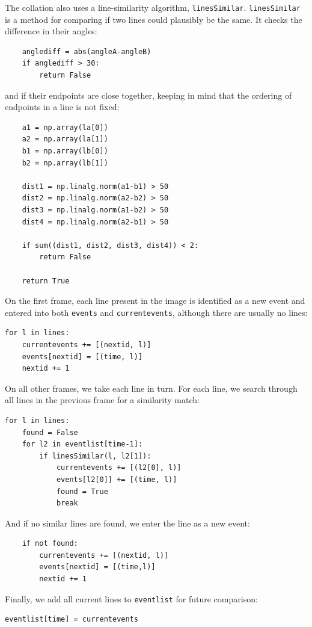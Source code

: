 \documentclass[notitlepage]{article}
\begin{document}
The collation also uses a line-similarity algorithm, \texttt{linesSimilar}.  \texttt{linesSimilar} is a method for comparing if two lines could plausibly be the same.  It checks the difference in their angles:
\begin{lstlisting}
    anglediff = abs(angleA-angleB)
    if anglediff > 30:
        return False
\end{lstlisting}    
and if their endpoints are close together, keeping in mind that the ordering of endpoints in a line is not fixed:
\begin{lstlisting}
    a1 = np.array(la[0])
    a2 = np.array(la[1])
    b1 = np.array(lb[0])
    b2 = np.array(lb[1])
    
    dist1 = np.linalg.norm(a1-b1) > 50
    dist2 = np.linalg.norm(a2-b2) > 50
    dist3 = np.linalg.norm(a1-b2) > 50
    dist4 = np.linalg.norm(a2-b1) > 50
    
    if sum((dist1, dist2, dist3, dist4)) < 2:
        return False
    
    return True
\end{lstlisting}    

On the first frame, each line present in the image is identified as a new event and entered into both \texttt{events} and \texttt{currentevents}, although there are usually no lines:
\begin{lstlisting}
for l in lines:
    currentevents += [(nextid, l)]
    events[nextid] = [(time, l)]
    nextid += 1
\end{lstlisting}    
    
On all other frames, we take each line in turn.  For each line, we search through all lines in the previous frame for a similarity match:
\begin{lstlisting}
for l in lines:
    found = False
    for l2 in eventlist[time-1]:
        if linesSimilar(l, l2[1]):
            currentevents += [(l2[0], l)]
            events[l2[0]] += [(time, l)]
            found = True
            break
\end{lstlisting}    

And if no similar lines are found, we enter the line as a new event:
\begin{lstlisting}
    if not found:
        currentevents += [(nextid, l)]
        events[nextid] = [(time,l)]
        nextid += 1
\end{lstlisting}    

Finally, we add all current lines to \texttt{eventlist} for future comparison:
\begin{lstlisting}
eventlist[time] = currentevents
\end{lstlisting}    
\end{document}
